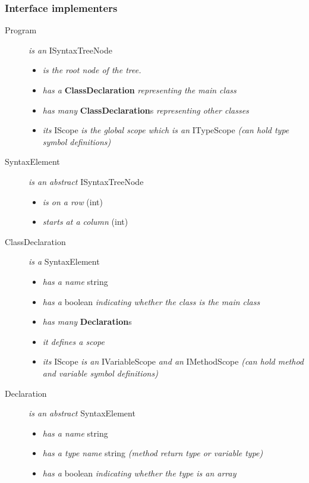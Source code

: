 \documentclass[a4paper,11pt]{article}
\begin{document}
\subsubsection{Interface implementers}
\begin{description}
    \item[Program] \emph{is an} ISyntaxTreeNode
      \begin{itemize}
        \item \emph{is the root node of the tree.}
        \item \emph{has a} \textbf{ClassDeclaration} \emph{representing the main class}
        \item \emph{has many} \textbf{ClassDeclaration}s \emph{representing other classes}
        \item \emph{its} IScope \emph{is the global scope which is an} ITypeScope \emph{(can hold type symbol definitions)}
      \end{itemize}
    \item[SyntaxElement] \emph{is an abstract} ISyntaxTreeNode
      \begin{itemize}
        \item \emph{is on a row} (int)
        \item \emph{starts at a column} (int)
      \end{itemize}
    \item[ClassDeclaration] \emph{is a} SyntaxElement
      \begin{itemize}
        \item \emph{has a name} string
        \item \emph{has a} boolean \emph{indicating whether the class is the main class}
        \item \emph{has many} \textbf{Declaration}s
        \item \emph{it defines a scope}
        \item \emph{its} IScope \emph{is an} IVariableScope \emph{and an} IMethodScope \emph{(can hold method and variable symbol definitions)}
      \end{itemize}
    \item[Declaration] \emph{is an abstract} SyntaxElement
      \begin{itemize}
        \item \emph{has a name} string
        \item \emph{has a type name} string \emph{(method return type or variable type)}
        \item \emph{has a} boolean \emph{indicating whether the type is an array}

\end{itemize}
\end{description}
\end{document}
